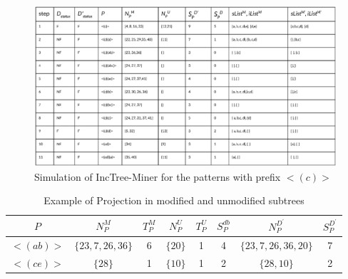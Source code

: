 \begin{figure}[!tb]
\centering
\includegraphics[width=\textwidth]{IncTree-Miner_Simulations}
\caption{Simulation of IncTree-Miner for the patterns with prefix $< (c) >$} \label{figure:inc_tree_miner_simulation}
\hfil
\end{figure}

\begin{table}[!htb]
\centering
\begin{tabular}{|c|c|c|c|c|c|c|c|}
\hline
$P$ & $N_{P}^{M}$ & $T_{P}^{M}$ &$N_{P}^{U}$ & $T_{P}^{U}$ & $S_{P}^{db}$ & $N_{P}^{D^{\prime}}$ & $S_{P}^{D^{\prime}}$\\
\hline
$< (ab) >$ & $\{  23,7,26,36 \}$ & 6 & $\{ 20 \}$ & 1 & 4 & $\{ 23,7,26,36, 20\}$ & 7 \\ \hline
$< (ce) >$ & $\{  28 \}$ & 1 & $\{ 10 \}$ & 1 & 2 & $\{28, 10\}$ & 2\\
\hline
\end{tabular}
\caption{Example of Projection in modified and unmodified subtrees}
\label{table:separate_projection_example}
\end{table}

